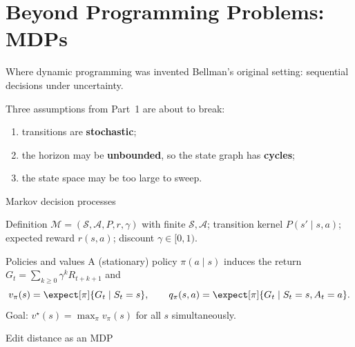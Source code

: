 \section{Beyond Programming Problems: MDPs}

\begin{frame}{Where dynamic programming was invented}
	Bellman's original setting: \alert{sequential decisions under uncertainty}.

	\vspace{0.5em}
	Three assumptions from Part~1 are about to break:
	\begin{enumerate}
		\item transitions are \textbf{stochastic};
		\item the horizon may be \textbf{unbounded}, so the state graph has \textbf{cycles};
		\item the state space may be too large to sweep.
	\end{enumerate}
\end{frame}

\begin{frame}{Markov decision processes}
	\begin{block}{Definition}
		$\mathcal M=(\mathcal S,\mathcal A,P,r,\gamma)$ with finite $\mathcal S,\mathcal A$; transition kernel
		$P(s'\mid s,a)$; expected reward $r(s,a)$; discount $\gamma\in[0,1)$.
	\end{block}
\end{frame}

\begin{frame}{Policies and values}
	A (stationary) policy $\pi(a\mid s)$ induces the return $G_t=\sum_{k\ge0}\gamma^kR_{t+k+1}$ and
	\[
		v_\pi(s)=\expect[\pi]{G_t\mid S_t=s},\qquad
		q_\pi(s,a)=\expect[\pi]{G_t\mid S_t=s,A_t=a}.
	\]
	Goal: $v^\star(s)=\max_\pi v_\pi(s)$ for all $s$ simultaneously.
\end{frame}

\begin{frame}{Edit distance as an MDP}
\end{frame}

